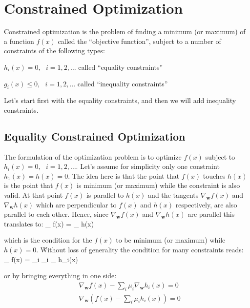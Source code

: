 \chapter{Constrained Optimization} \label{ch:constrained-optimization}

Constrained optimization is the problem of finding a minimum (or maximum) of a function $f(x)$ called the
``objective function'', subject to a number of constraints of the following types:
\bit
\item $h_{i}(x) =0, \:\:\: i=1,2,\ldots$ called ``equality constraints''
\item $g_{i}(x) \leq 0, \:\:\: i=1,2,\ldots$ called ``inequality constraints''
\eit

Let's start first with the equality constraints, and then we will add inequality constraints.

\section{Equality Constrained Optimization}

The formulation of the optimization problem is to optimize $f(x)$ subject to $h_{i}(x) = 0, \:\:\: i=1,2,\ldots$.
Let's assume for simplicity only one constraint $h_{1}(x) = h(x) = 0$. The idea here is that the point that $f(x)$
touches $h(x)$ is the point that $f(x)$ is minimum (or maximum) while the constraint is also valid. At that point $f
(x)$ is parallel to $h(x)$ and the tangents $\nabla_{\boldsymbol{w}} f(x)$ and $\nabla_{\boldsymbol{w}} h(x)$ which
are perpendicular to $f(x)$ and $h(x)$ respectively, are also parallel to each other. Hence, since
$\nabla_{\boldsymbol{w}} f(x)$ and $\nabla_{\boldsymbol{w}} h(x)$ are parallel this translates to:
\bse
\nabla_{} f(x) = \mu \nabla_{} h(x)
\ese

\vspace{3pt}

which is the condition for the $f(x)$ to be minimum (or maximum) while $h(x) = 0$. \v

Without loss of generality the condition for many constraints reads:
\bse
\nabla_{} f(x) = \sum_{i} \mu_{i} \nabla_{} h_{i}(x)
\ese

or by bringing everything in one side:
\begin{align*}
& \nabla_{\boldsymbol{w}} f(x) - \sum_{i} \mu_{i} \nabla_{\boldsymbol{w}} h_{i}(x) = 0 \\
& \nabla_{\boldsymbol{w}} (f(x) - \sum_{i} \mu_{i} h_{i}(x)) = 0
\end{align*}


